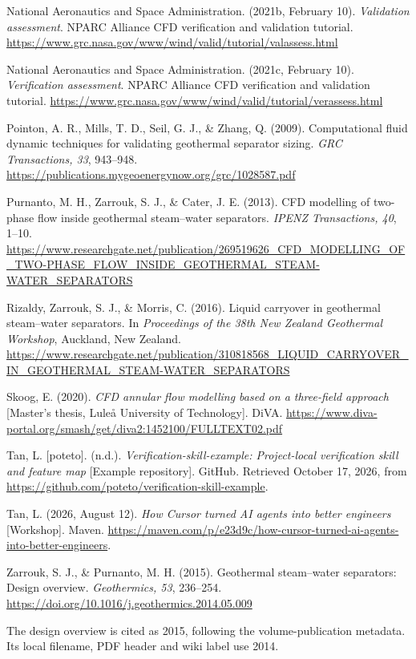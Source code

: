 \documentclass[12pt]{article}
\begin{document}
National Aeronautics and Space Administration. (2021b, February 10). \emph{Validation assessment}. NPARC Alliance CFD verification and validation tutorial. \url{https://www.grc.nasa.gov/www/wind/valid/tutorial/valassess.html}

National Aeronautics and Space Administration. (2021c, February 10). \emph{Verification assessment}. NPARC Alliance CFD verification and validation tutorial. \url{https://www.grc.nasa.gov/www/wind/valid/tutorial/verassess.html}

Pointon, A. R., Mills, T. D., Seil, G. J., \& Zhang, Q. (2009). Computational fluid dynamic techniques for validating geothermal separator sizing. \emph{GRC Transactions, 33}, 943--948. \url{https://publications.mygeoenergynow.org/grc/1028587.pdf}

Purnanto, M. H., Zarrouk, S. J., \& Cater, J. E. (2013). CFD modelling of two-phase flow inside geothermal steam--water separators. \emph{IPENZ Transactions, 40}, 1--10. \url{https://www.researchgate.net/publication/269519626_CFD_MODELLING_OF_TWO-PHASE_FLOW_INSIDE_GEOTHERMAL_STEAM-WATER_SEPARATORS}

Rizaldy, Zarrouk, S. J., \& Morris, C. (2016). Liquid carryover in geothermal steam--water separators. In \emph{Proceedings of the 38th New Zealand Geothermal Workshop}, Auckland, New Zealand. \url{https://www.researchgate.net/publication/310818568_LIQUID_CARRYOVER_IN_GEOTHERMAL_STEAM-WATER_SEPARATORS}

Skoog, E. (2020). \emph{CFD annular flow modelling based on a three-field approach} {[}Master's thesis, Luleå University of Technology{]}. DiVA. \url{https://www.diva-portal.org/smash/get/diva2:1452100/FULLTEXT02.pdf}

Tan, L. {[}poteto{]}. (n.d.). \emph{Verification-skill-example: Project-local verification skill and feature map} {[}Example repository{]}. GitHub. Retrieved October 17, 2026, from \url{https://github.com/poteto/verification-skill-example}.

Tan, L. (2026, August 12). \emph{How Cursor turned AI agents into better engineers} {[}Workshop{]}. Maven. \url{https://maven.com/p/e23d9c/how-cursor-turned-ai-agents-into-better-engineers}.

Zarrouk, S. J., \& Purnanto, M. H. (2015). Geothermal steam--water separators: Design overview. \emph{Geothermics, 53}, 236--254. \url{https://doi.org/10.1016/j.geothermics.2014.05.009}

The design overview is cited as 2015, following the volume-publication metadata. Its local filename, PDF header and wiki label use 2014.
\end{document}
